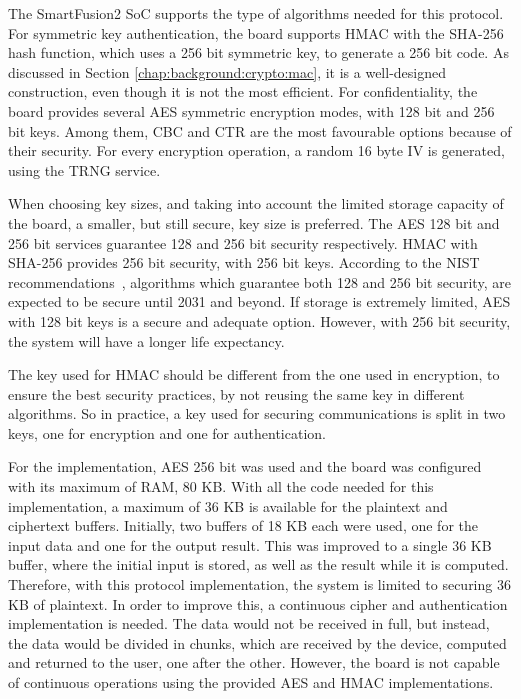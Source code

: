The SmartFusion2 SoC supports the type of algorithms needed for this protocol.
For symmetric key authentication, the board supports HMAC with the SHA-256 hash function, which uses a 256 bit symmetric key, to generate a 256 bit code. As discussed in Section \ref{chap:background:crypto:mac}, it is a well-designed construction, even though it is not the most efficient.
For confidentiality, the board provides several AES symmetric encryption modes, with 128 bit and 256 bit keys. Among them, CBC and CTR are the most favourable options because of their security.
For every encryption operation, a random 16 byte IV is generated, using the TRNG service.

When choosing key sizes, and taking into account the limited storage capacity of the board, a smaller, but still secure, key size is preferred. The AES 128 bit and 256 bit services guarantee 128 and 256 bit security respectively. HMAC with SHA-256 provides 256 bit security, with 256 bit keys.
According to the NIST recommendations~\cite{nistRecommendations}, algorithms which guarantee both 128 and 256 bit security, are expected to be secure until 2031 and beyond. If storage is extremely limited, AES with 128 bit keys is a secure and adequate option. However, with 256 bit security, the system will have a longer life expectancy.

The key used for HMAC should be different from the one used in encryption, to ensure the best security practices, by not reusing the same key in different algorithms. So in practice, a key used for securing communications is split in two keys, one for encryption and one for authentication.

For the implementation, AES 256 bit was used and the board was configured with its maximum of RAM, 80 KB. With all the code needed for this implementation, a maximum of 36 KB is available for the plaintext and ciphertext buffers.
Initially, two buffers of 18 KB each were used, one for the input data and one for the output result. This was improved to a single 36 KB buffer, where the initial input is stored, as well as the result while it is computed.
Therefore, with this protocol implementation, the system is limited to securing 36 KB of plaintext.
In order to improve this, a continuous cipher and authentication implementation is needed. The data would not be received in full, but instead, the data would be divided in chunks, which are received by the device, computed and returned to the user, one after the other. However, the board is not capable of continuous operations using the provided AES and HMAC implementations.

